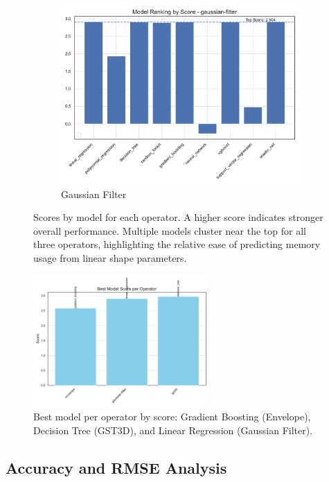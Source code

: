 \begin{figure}[htbp]
\begin{subfigure}[t]{0.32\textwidth}
        \includegraphics[width=\textwidth]{assets/images/05/score_by_model_gaussian-filter}
        \caption{Gaussian Filter}
    \end{subfigure}
    \caption{Scores by model for each operator.
    A higher score indicates stronger overall performance.
    Multiple models cluster near the top for all three operators, highlighting the relative ease of predicting memory usage from linear shape parameters.}
    \label{fig:score_by_model_operators}
\end{figure}

\begin{figure}[htbp]
    \centering
    \includegraphics[width=0.6\textwidth]{assets/images/05/best_model_per_operator}
    \caption{Best model per operator by score: Gradient Boosting (Envelope), Decision Tree (\ac{GST3D}), and Linear Regression (Gaussian Filter).}
    \label{fig:best_model_per_operator}
\end{figure}

\subsection{Accuracy and RMSE Analysis}
\label{subsec:accuracy-and-rmse-analysis}

